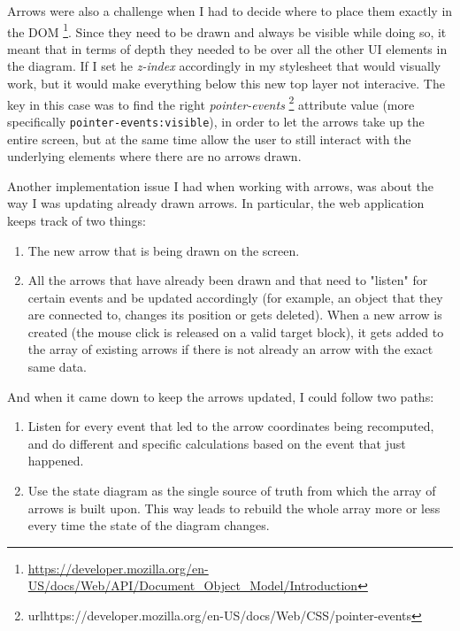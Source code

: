 \documentclass[]{usiinfbachelorproject}
\begin{document}
\noindent Arrows were also a challenge when I had to decide where to place them exactly in the DOM \footnote{\url{https://developer.mozilla.org/en-US/docs/Web/API/Document_Object_Model/Introduction}}. Since they need to be drawn and always be visible while doing so, it meant that in terms of depth they needed to be over all the other UI elements in the diagram. If I set he \emph{z-index} accordingly in my stylesheet that would visually work, but it would make everything below this new top layer not interacive. The key in this case was to find the right \emph{pointer-events} \footnote{url{https://developer.mozilla.org/en-US/docs/Web/CSS/pointer-events}} attribute value (more specifically \texttt{pointer-events:visible}), in order to let the arrows take up the entire screen, but at the same time allow the user to still interact with the underlying elements where there are no arrows drawn.\\

\vspace{\fill}
\pagebreak

\noindent Another implementation issue I had when working with arrows, was about the way I was updating already drawn arrows. In particular, the web application keeps track of two things:

\begin{enumerate}
	\item The new arrow that is being drawn on the screen.
	\item All the arrows that have already been drawn and that need to "listen" for certain events and be updated accordingly (for example, an object that they are connected to, changes its position or gets deleted). When a new arrow is created (the mouse click is released on a valid target block), it gets added to the array of existing arrows if there is not already an arrow with the exact same data. 
\end{enumerate}

\noindent And when it came down to keep the arrows updated, I could follow two paths:

\begin{enumerate}
	\item Listen for every event that led to the arrow coordinates being recomputed, and do different and specific calculations based on the event that just happened.
	\item Use the state diagram as the single source of truth from which the array of arrows is built upon. This way leads to rebuild the whole array more or less every time the state of the diagram changes.
\end{enumerate}
\end{document}
